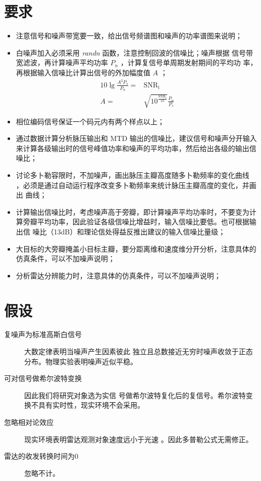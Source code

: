 \documentclass[../main]{subfiles}
\begin{document}
\section{要求}%
\label{sec:requirement}

\begin{itemize}
  \item 注意信号和噪声带宽要一致，给出信号频谱图和噪声的功率谱图来说明；
  \item 白噪声加入必须采用 \emph{randn} 函数，注意控制回波的信噪比；噪声根据
    信号带宽滤波，再计算噪声平均功率 $P_n$ ，计算复信号单周期发射期间的平均功
    率，再根据输入信噪比计算出信号的外加幅度值 $A$ ；
    \begin{align}
      10\lg \frac{A^2P_s}{P_n} = & \mathrm{SNR}_\mathrm{i}\\
      A = & \sqrt{10^{\frac{\mathrm{SNR}_\mathrm{i}}{10}}}\frac{P_n}{P_s}
    \end{align}
  \item 相位编码信号保证一个码元内有两个样点以上；
  \item 通过数据计算分析脉压输出和 MTD 输出的信噪比，建议信号和噪声分开输入
    来计算各级输出时的信号峰值功率和噪声的平均功率，然后给出各级的输出信噪比；
  \item 讨论多卜勒容限时，不加噪声，画出脉压主瓣高度随多卜勒频率的变化曲线
    ，必须是通过自动运行程序改变多卜勒频率来统计脉压主瓣高度的变化，并画出
    曲线；
  \item  计算输出信噪比时，考虑噪声高于旁瓣，即计算噪声平均功率时，不要变为计
    算旁瓣平均功率，因此验证各级信噪比增益时，输入信噪比要低。也可根据输出信
    噪比（13dB）和理论信处得益反推出建议的输入信噪比量级；
  \item 大目标的大旁瓣掩盖小目标主瓣，要分距离维和速度维分开分析，注意具体的
    仿真条件，可以不加噪声说明；
  \item 分析雷达分辨能力时，注意具体的仿真条件，可以不加噪声说明；
\end{itemize}

\section{假设}%
\label{sec:assumption}

\begin{description}
  \item[复噪声为标准高斯白信号]\label{it:noise}大数定律表明当噪声产生因素彼此
    独立且总数接近无穷时噪声收敛于正态分布。物理实验表明噪声近似平稳。
  \item[可对信号做希尔波特变换]\label{it:hillbert}因此我们将研究对象选为实信
    号做希尔波特复化后的复信号。希尔波特变换不具有实时性，现实环境不会采用。
  \item[忽略相对论效应]\label{doppler}现实环境表明雷达观测对象速度远小于光速
    。因此多普勒公式无需修正。
  \item[雷达的收发转换时间为0]\label{it:time_switch}忽略不计。
\end{description}
\end{document}
